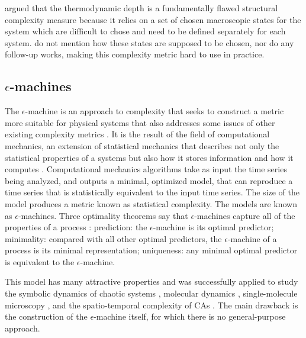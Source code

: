 \textcite{crutchfieldThermodynamicDepthCausal1999} argued that the thermodynamic
depth is a fundamentally flawed structural complexity measure because it relies
on a set of chosen macroscopic states for the system which are difficult to
chose and need to be defined separately for each system.
\textcite{lloydComplexityThermodynamicDepth1988} do not mention how these states
are supposed to be chosen, nor do any follow-up works, making this complexity
metric hard to use in practice.

\subsection{$\epsilon$-machines}

The $\epsilon$-machine is an approach to complexity that seeks to construct a metric
more suitable for physical systems that also addresses some issues of other
existing complexity metrics \parencite{crutchfieldOrderChaos2012}. It is the
result of the field of computational mechanics, an extension of statistical
mechanics that describes not only the statistical properties of a systems but
also how it stores information and how it computes
\parencite{crutchfieldInferringStatisticalComplexity1989,
  crutchfieldCalculiEmergenceComputation1994,
  feldmanMeasuresStatisticalComplexity1998, crutchfieldOrderChaos2012}.
Computational mechanics algorithms take as input the time series being analyzed,
and outputs a minimal, optimized model, that can reproduce a time series that is
statistically equivalent to the input time series. The size of the model
produces a metric known as statistical complexity. The models are known as
$\epsilon$-machines. Three optimality theorems say that $\epsilon$-machines capture all of the
properties of a process
\parencite{crutchfieldInferringStatisticalComplexity1989,
  crutchfieldThermodynamicDepthCausal1999,
  shaliziComputationalMechanicsPattern2001}: prediction: the $\epsilon$-machine is its
optimal predictor; minimality: compared with all other optimal predictors, the
$\epsilon$-machine of a process is its minimal representation; uniqueness: any minimal
optimal predictor is equivalent to the $\epsilon$-machine.

This model has many attractive properties and was successfully applied to study
the symbolic dynamics of chaotic systems
\parencite{crutchfieldCalculiEmergenceComputation1994}, molecular dynamics
\parencite{ryabovComputationalMechanicsMolecular2011}, single-molecule
microscopy \parencite{kellyNewMethodInferring2012}, and the spatio-temporal
complexity of \acp{CA} \parencite{crutchfieldTurbulentPatternBases1993,
  hansonComputationalMechanicsCellular1997,
  shaliziQuantifyingSelfOrganizationOptimal2004}. The main drawback is the
construction of the $\epsilon$-machine itself, for which there is no
general-purpose approach.

